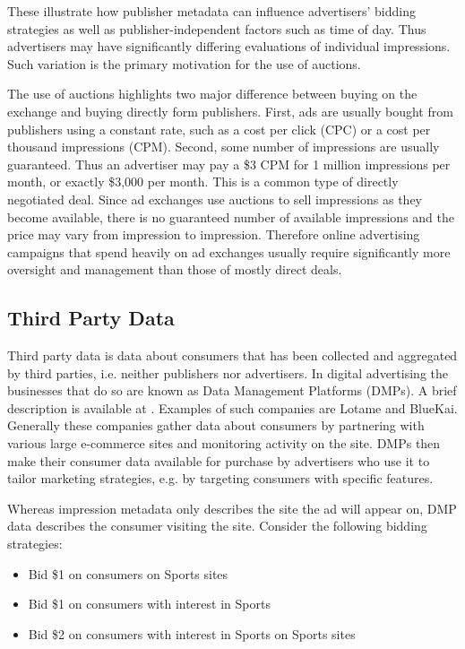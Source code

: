 \documentclass{article}
\begin{document}
These illustrate how publisher metadata can influence advertisers' bidding strategies as well as publisher-independent factors such as time of day. Thus advertisers may have significantly differing evaluations of individual impressions. Such variation is the primary motivation for the use of auctions.

The use of auctions highlights two major difference between buying on the exchange and buying directly form publishers. First, ads are usually bought from publishers using a constant rate, such as a cost per click (CPC) or a cost per thousand impressions (CPM). Second, some number of impressions are usually guaranteed. Thus an advertiser may pay a \$3 CPM for 1 million impressions per month, or exactly \$3,000 per month. This is a common type of directly negotiated deal. Since ad exchanges use auctions to sell impressions as they become available, there is no guaranteed number of available impressions and the price may vary from impression to impression. Therefore online advertising campaigns that spend heavily on ad exchanges usually require significantly more oversight and management than those of mostly direct deals.

\subsection{Third Party Data}

Third party data is data about consumers that has been collected and aggregated by third parties, i.e. neither publishers nor advertisers. In digital advertising the businesses that do so are known as Data Management Platforms (DMPs). A brief description is available at \cite{iab1}. Examples of such companies are Lotame and  BlueKai. Generally these companies gather data about consumers by partnering with various large e-commerce sites and monitoring activity on the site. DMPs then make their consumer data available for purchase by advertisers who use it to tailor marketing strategies, e.g. by targeting consumers with specific features.

Whereas impression metadata only describes the site the ad will appear on, DMP data describes the consumer visiting the site. Consider the following bidding strategies:

\begin{itemize}
\item Bid \$1 on consumers on Sports sites
\item Bid \$1 on consumers with interest in Sports
\item Bid \$2 on consumers with interest in Sports on Sports sites
\end{itemize}
\end{document}
